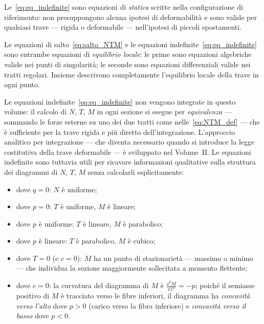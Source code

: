\begin{oss}
	Le~\eqref{eq:eq_indefinite} sono equazioni di
	\emph{statica} scritte nella configurazione
	di riferimento: non presuppongono alcuna
	ipotesi di deformabilità e sono valide per
	qualsiasi trave --- rigida o deformabile ---
	nell'ipotesi di piccoli spostamenti.
\end{oss}

\begin{oss}
	Le equazioni di salto~\eqref{eq:salto_NTM}
	e le equazioni indefinite~\eqref{eq:eq_indefinite}
	sono entrambe equazioni di \emph{equilibrio
		locale}: le prime sono equazioni algebriche
	valide nei punti di singolarità; le seconde
	sono equazioni differenziali valide nei tratti
	regolari. Insieme descrivono completamente
	l'equilibrio locale della trave in ogni punto.
\end{oss}


Le equazioni indefinite~\eqref{eq:eq_indefinite}
non vengono integrate in questo volume: il calcolo
di $N$, $T$, $M$ in ogni sezione si esegue per
\emph{equivalenza} --- sommando le forze esterne
su uno dei due tratti come nelle~\eqref{eq:NTM_def}
--- che è sufficiente per la trave rigida e più
diretto dell'integrazione. L'approccio analitico
per integrazione --- che diventa necessario quando
si introduce la legge costitutiva della trave
deformabile --- è sviluppato nel Volume~II.
Le equazioni indefinite sono tuttavia utili
per ricavare informazioni qualitative sulla
struttura dei diagrammi di $N$, $T$, $M$
senza calcolarli esplicitamente:
\begin{itemize}[nosep]
	\item dove $q = 0$: $N$ è uniforme;
	\item dove $p = 0$: $T$ è uniforme,
	$M$ è lineare;
	\item dove $p$ è uniforme: $T$ è lineare,
	$M$ è parabolico;
	\item dove $p$ è lineare: $T$ è parabolico,
	$M$ è cubico;
	\item dove $T = 0$ (e $c = 0$): $M$ ha un
	punto di stazionarietà --- massimo o minimo
	--- che individua la sezione maggiormente
	sollecitata a momento flettente;
	\item dove $c = 0$: la curvatura del diagramma
	di $M$ è $\frac{\dd^2 M}{\dd z^2} = -p$;
	poiché il semiasse positivo di $M$ è tracciato
	verso le fibre inferiori, il diagramma ha
	\emph{concavità verso l'alto} dove $p > 0$
	(carico verso la fibra inferiore) e
	\emph{concavità verso il basso} dove $p < 0$.
\end{itemize}




